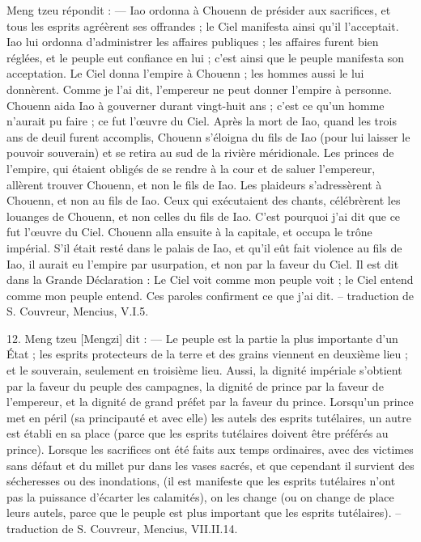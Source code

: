 \begin{singlequote}
Meng tzeu répondit :
—	Iao ordonna à Chouenn de présider aux sacrifices, et tous les esprits agréèrent ses offrandes ; le Ciel manifesta ainsi qu’il l’acceptait. Iao lui ordonna d’administrer les affaires publiques ; les affaires furent bien réglées, et le peuple eut confiance en lui ; c’est ainsi que le peuple manifesta son acceptation. Le Ciel donna l’empire à Chouenn ; les hommes aussi le lui donnèrent. Comme je l’ai dit, l’empereur ne peut donner l’empire à personne.
Chouenn aida Iao à gouverner durant vingt-huit ans ; c’est ce qu’un homme n’aurait pu faire ; ce fut l’œuvre du Ciel. Après la mort de Iao, quand les trois ans de deuil furent accomplis, Chouenn s’éloigna du fils de Iao (pour lui laisser le pouvoir souverain) et se retira au sud de la rivière méridionale. Les princes de l’empire, qui étaient obligés de se rendre à la cour et de saluer l’empereur, allèrent trouver Chouenn, et non le fils de Iao. Les plaideurs s’adressèrent à Chouenn, et non au fils de Iao. Ceux qui exécutaient des chants, célébrèrent les louanges de Chouenn, et non celles du fils de Iao. C’est pourquoi j’ai dit que ce fut l’œuvre du Ciel. Chouenn alla ensuite à la capitale, et occupa le trône impérial. S’il était resté dans le palais de Iao, et qu’il eût fait violence au fils de Iao, il aurait eu l’empire par usurpation, et non par la faveur du Ciel. Il est dit dans la Grande Déclaration :
Le Ciel voit comme mon peuple voit ; le Ciel entend comme mon peuple entend.
Ces paroles confirment ce que j’ai dit.
-- traduction de S. Couvreur, Mencius, V.I.5.
  
\end{singlequote}

\begin{singlequote}
    12.	Meng tzeu [Mengzi] dit :
—	Le peuple est la partie la plus importante d’un État ; les esprits protecteurs de la terre et des grains viennent en deuxième lieu ; et le souverain, seulement en troisième lieu. Aussi, la dignité impériale s’obtient par la faveur du peuple des campagnes, la dignité de prince par la faveur de l’empereur, et la dignité de grand préfet par la faveur du prince. Lorsqu’un prince met en péril (sa principauté et avec elle) les autels des esprits tutélaires, un autre est établi en sa place (parce que les esprits tutélaires doivent être préférés au prince). Lorsque les sacrifices ont été faits aux temps ordinaires, avec des victimes sans défaut et du millet pur dans les vases sacrés, et que cependant il survient des sécheresses ou des inondations, (il est manifeste que les esprits tutélaires n’ont pas la puissance d’écarter les calamités), on les change (ou on change de place leurs autels, parce que le peuple est plus important que les esprits tutélaires).
-- traduction de S. Couvreur, Mencius, VII.II.14.

\end{singlequote}
